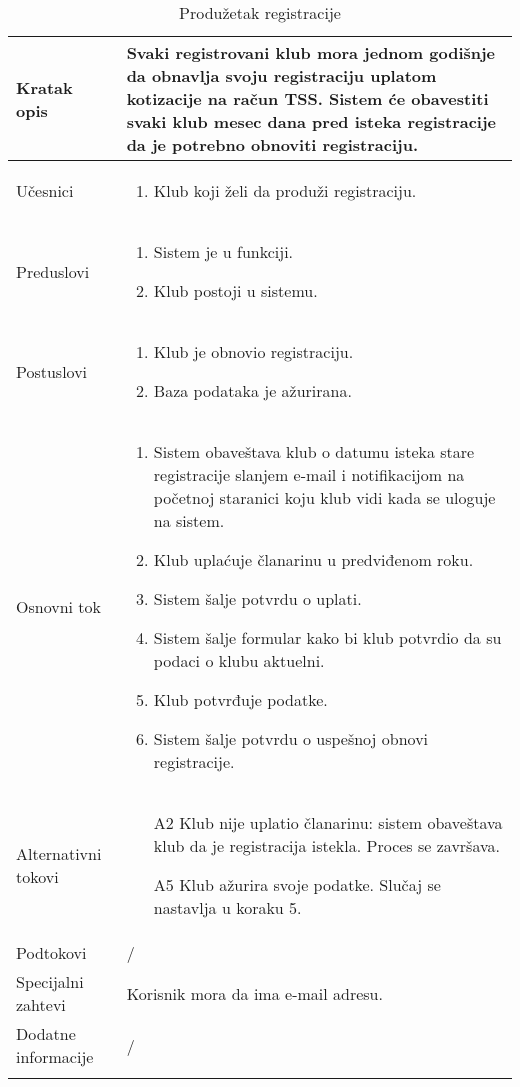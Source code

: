\documentclass{article}
\begin{document}
\begin{longtable}{| p{} | p{} |} 
\hline
    Kratak opis & Svaki registrovani klub mora jednom godišnje da obnavlja svoju registraciju uplatom kotizacije na račun TSS. Sistem će obavestiti svaki klub mesec dana pred isteka registracije da je potrebno obnoviti registraciju.\\ 
\hline    
    Učesnici & \begin{enumerate}
        \item Klub koji želi da produži registraciju.
    \end{enumerate}
    \\
\hline
   Preduslovi & \begin{enumerate}
       \item Sistem je u funkciji.
       \item Klub postoji u sistemu.
   \end{enumerate}\\
\hline  
    Postuslovi & \begin{enumerate}
        \item Klub je obnovio registraciju.
        \item Baza podataka je ažurirana.
    \end{enumerate}\\
\hline
    Osnovni tok & \begin{enumerate}
        \item Sistem obaveštava klub o datumu isteka stare registracije slanjem e-mail i notifikacijom na početnoj staranici koju klub vidi kada se uloguje na sistem.
        \item Klub uplaćuje članarinu u predviđenom roku.
        \item Sistem šalje potvrdu o uplati.
        \item Sistem šalje formular kako bi klub potvrdio da su podaci o klubu aktuelni.
        \item Klub potvrđuje podatke.
        \item Sistem šalje potvrdu o uspešnoj obnovi registracije.
    
    \end{enumerate}\\
\hline
    Alternativni tokovi & \begin{itemize}
        \item[A2] Klub nije uplatio članarinu: sistem obaveštava klub da je registracija istekla. Proces se završava.
        \item[A5] Klub ažurira svoje podatke. Slučaj se nastavlja u koraku 5.
    \end{itemize}\\
\hline
    Podtokovi & /\\
\hline
    Specijalni zahtevi & Korisnik mora da ima e-mail adresu.\\
\hline
    Dodatne informacije & / \\
\hline
    
\caption{Produžetak registracije} 

\end{longtable}
\end{document}
